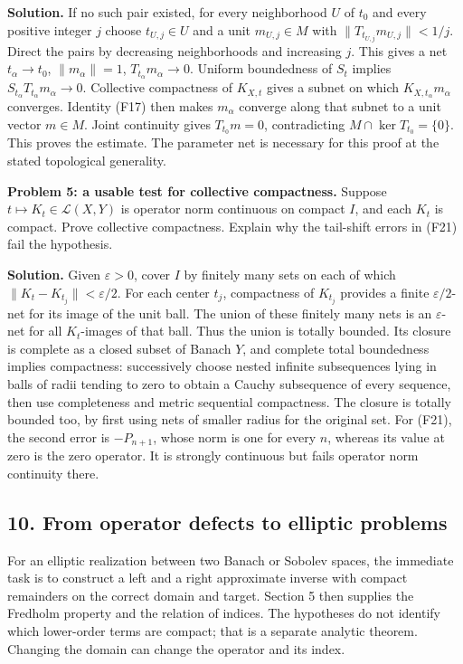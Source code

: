\documentclass[
  11pt,
]{article}
\begin{document}
\textbf{Solution.} If no such pair existed, for every neighborhood \(U\)
of \(t_0\) and every positive integer \(j\) choose \(t_{U,j}\in U\) and
a unit \(m_{U,j}\in M\) with \(\|T_{t_{U,j}}m_{U,j}\|<1/j\). Direct the
pairs by decreasing neighborhoods and increasing \(j\). This gives a net
\(t_\alpha\to t_0\), \(\|m_\alpha\|=1\), \(T_{t_\alpha}m_\alpha\to0\).
Uniform boundedness of \(S_t\) implies
\(S_{t_\alpha}T_{t_\alpha}m_\alpha\to0\). Collective compactness of
\(K_{X,t}\) gives a subnet on which \(K_{X,t_\alpha}m_\alpha\)
converges. Identity (F17) then makes \(m_\alpha\) converge along that
subnet to a unit vector \(m\in M\). Joint continuity gives
\(T_{t_0}m=0\), contradicting \(M\cap\ker T_{t_0}=\{0\}\). This proves
the estimate. The parameter net is necessary for this proof at the
stated topological generality.

\textbf{Problem 5: a usable test for collective compactness.} Suppose
\(t\mapsto K_t\in\mathcal L(X,Y)\) is operator norm continuous on
compact \(I\), and each \(K_t\) is compact. Prove collective
compactness. Explain why the tail-shift errors in (F21) fail the
hypothesis.

\textbf{Solution.} Given \(\varepsilon>0\), cover \(I\) by finitely many
sets on each of which \(\|K_t-K_{t_j}\|<\varepsilon/2\). For each center
\(t_j\), compactness of \(K_{t_j}\) provides a finite
\(\varepsilon/2\)-net for its image of the unit ball. The union of these
finitely many nets is an \(\varepsilon\)-net for all \(K_t\)-images of
that ball. Thus the union is totally bounded. Its closure is complete as
a closed subset of Banach \(Y\), and complete total boundedness implies
compactness: successively choose nested infinite subsequences lying in
balls of radii tending to zero to obtain a Cauchy subsequence of every
sequence, then use completeness and metric sequential compactness. The
closure is totally bounded too, by first using nets of smaller radius
for the original set. For (F21), the second error is \(-P_{n+1}\), whose
norm is one for every \(n\), whereas its value at zero is the zero
operator. It is strongly continuous but fails operator norm continuity
there.

\subsection{10. From operator defects to elliptic
problems}\label{from-operator-defects-to-elliptic-problems}

For an elliptic realization between two Banach or Sobolev spaces, the
immediate task is to construct a left and a right approximate inverse
with compact remainders on the correct domain and target. Section 5 then
supplies the Fredholm property and the relation of indices. The
hypotheses do not identify which lower-order terms are compact; that is
a separate analytic theorem. Changing the domain can change the operator
and its index.
\end{document}
